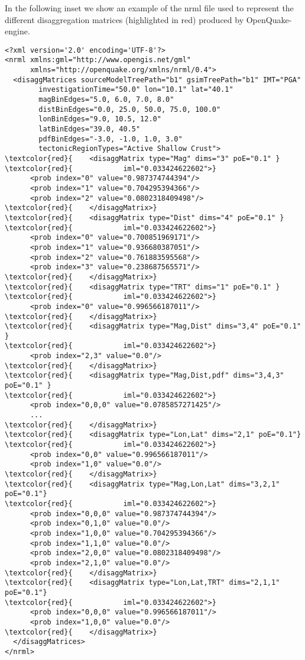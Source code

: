 In the following inset we show an example of the nrml file 
used to represent the different disaggregation matrices (highlighted 
in red) produced by OpenQuake-engine.
%
\begin{Verbatim}[frame=single, commandchars=\\\{\}, fontsize=\small]
<?xml version='2.0' encoding='UTF-8'?>
<nrml xmlns:gml="http://www.opengis.net/gml" 
      xmlns="http://openquake.org/xmlns/nrml/0.4">
  <disaggMatrices sourceModelTreePath="b1" gsimTreePath="b1" IMT="PGA" 
        investigationTime="50.0" lon="10.1" lat="40.1" 
        magBinEdges="5.0, 6.0, 7.0, 8.0" 
        distBinEdges="0.0, 25.0, 50.0, 75.0, 100.0" 
        lonBinEdges="9.0, 10.5, 12.0" 
        latBinEdges="39.0, 40.5" 
        pdfBinEdges="-3.0, -1.0, 1.0, 3.0" 
        tectonicRegionTypes="Active Shallow Crust">
\textcolor{red}{    <disaggMatrix type="Mag" dims="3" poE="0.1" }
\textcolor{red}{            iml="0.033424622602">}
      <prob index="0" value="0.987374744394"/>
      <prob index="1" value="0.704295394366"/>
      <prob index="2" value="0.0802318409498"/>
\textcolor{red}{    </disaggMatrix>}
\textcolor{red}{    <disaggMatrix type="Dist" dims="4" poE="0.1" }
\textcolor{red}{            iml="0.033424622602">}
      <prob index="0" value="0.700851969171"/>
      <prob index="1" value="0.936680387051"/>
      <prob index="2" value="0.761883595568"/>
      <prob index="3" value="0.238687565571"/>
\textcolor{red}{    </disaggMatrix>}
\textcolor{red}{    <disaggMatrix type="TRT" dims="1" poE="0.1" }
\textcolor{red}{            iml="0.033424622602">}
      <prob index="0" value="0.996566187011"/>
\textcolor{red}{    </disaggMatrix>}
\textcolor{red}{    <disaggMatrix type="Mag,Dist" dims="3,4" poE="0.1" }
\textcolor{red}{            iml="0.033424622602">}
      <prob index="2,3" value="0.0"/>
\textcolor{red}{    </disaggMatrix>}
\textcolor{red}{    <disaggMatrix type="Mag,Dist,pdf" dims="3,4,3" poE="0.1" }
\textcolor{red}{            iml="0.033424622602">}
      <prob index="0,0,0" value="0.0785857271425"/>
      ...
\textcolor{red}{    </disaggMatrix>}
\textcolor{red}{    <disaggMatrix type="Lon,Lat" dims="2,1" poE="0.1"}
\textcolor{red}{            iml="0.033424622602">}
      <prob index="0,0" value="0.996566187011"/>
      <prob index="1,0" value="0.0"/>
\textcolor{red}{    </disaggMatrix>}
\textcolor{red}{    <disaggMatrix type="Mag,Lon,Lat" dims="3,2,1" poE="0.1"} 
\textcolor{red}{            iml="0.033424622602">}
      <prob index="0,0,0" value="0.987374744394"/>
      <prob index="0,1,0" value="0.0"/>
      <prob index="1,0,0" value="0.704295394366"/>
      <prob index="1,1,0" value="0.0"/>
      <prob index="2,0,0" value="0.0802318409498"/>
      <prob index="2,1,0" value="0.0"/>
\textcolor{red}{    </disaggMatrix>}
\textcolor{red}{    <disaggMatrix type="Lon,Lat,TRT" dims="2,1,1" poE="0.1"} 
\textcolor{red}{            iml="0.033424622602">}
      <prob index="0,0,0" value="0.996566187011"/>
      <prob index="1,0,0" value="0.0"/>
\textcolor{red}{    </disaggMatrix>}
  </disaggMatrices>
</nrml>

\end{Verbatim}

